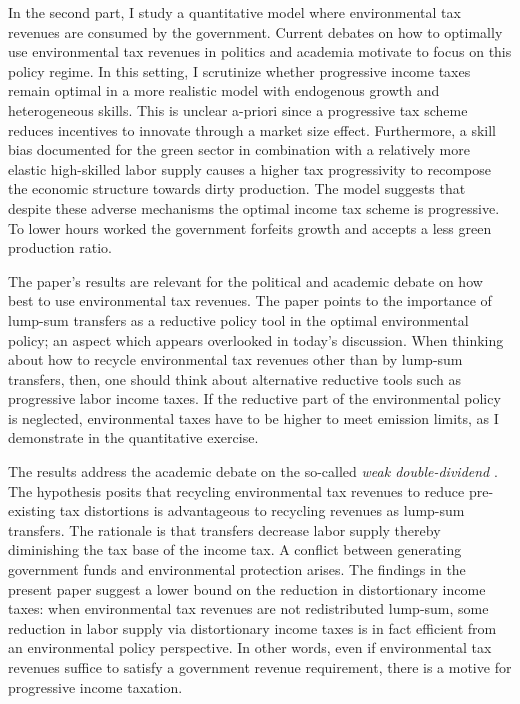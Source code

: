 In the second part, I study a quantitative model where environmental tax revenues are consumed by the government. Current debates on how to optimally use environmental tax revenues in politics and academia \citep[e.g.][]{Fried2018TheGenerations} motivate to focus on this policy regime. In this setting, I scrutinize whether progressive income taxes remain optimal in a more realistic model with endogenous growth and heterogeneous skills. This is unclear a-priori since a progressive tax scheme reduces incentives to innovate through a market size effect. Furthermore, a skill bias documented for the green sector \citep{Consoli2016DoCapital} in combination with a relatively more elastic high-skilled labor supply causes a higher tax progressivity to recompose the economic structure towards dirty production. The model suggests that despite these adverse mechanisms the optimal income tax scheme is progressive. To lower hours worked the government forfeits growth and accepts a less green production ratio.  

The paper's results are relevant for the political and academic debate on how best to use environmental tax revenues. The paper points to the importance of lump-sum transfers as a reductive policy tool in the optimal environmental policy; an aspect which appears overlooked in today's discussion.%
When thinking about how to recycle environmental tax revenues other than by lump-sum transfers, then, one should think about alternative reductive tools such as progressive labor income taxes. 
If the reductive part of the environmental policy is neglected, environmental taxes have to be higher to meet emission limits, as I demonstrate in the quantitative exercise.

The results address the academic debate on the so-called \textit{weak double-dividend} \citep[for example:][]{LansBovenberg1994EnvironmentalTaxation, LansBovenberg1996OptimalAnalyses}. The hypothesis posits that recycling environmental tax revenues to reduce pre-existing tax distortions is advantageous to recycling  revenues as lump-sum transfers. The rationale is that transfers decrease labor supply thereby diminishing the tax base of the income tax. A conflict between generating government funds and environmental protection arises. The findings in the present paper suggest a lower bound on the reduction in distortionary income taxes: when environmental tax revenues are not redistributed lump-sum, some reduction in labor supply via distortionary income taxes is in fact efficient from an environmental policy perspective. In other words, even if environmental tax revenues suffice to satisfy a government revenue requirement, there is a motive for progressive income taxation. 